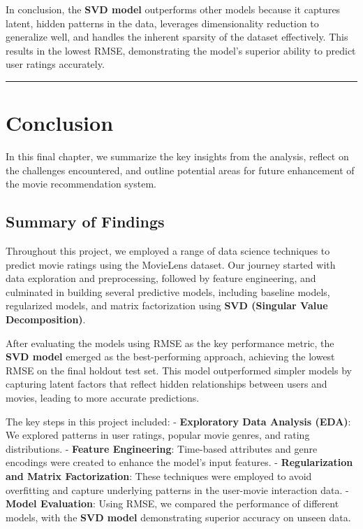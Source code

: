 \documentclass[
]{article}
\begin{document}
In conclusion, the \textbf{SVD model} outperforms other models because
it captures latent, hidden patterns in the data, leverages
dimensionality reduction to generalize well, and handles the inherent
sparsity of the dataset effectively. This results in the lowest RMSE,
demonstrating the model's superior ability to predict user ratings
accurately.

\begin{center}\rule{0.5\linewidth}{0.5pt}\end{center}

\section{Conclusion}\label{conclusion}

In this final chapter, we summarize the key insights from the analysis,
reflect on the challenges encountered, and outline potential areas for
future enhancement of the movie recommendation system.

\subsection{Summary of Findings}\label{summary-of-findings}

Throughout this project, we employed a range of data science techniques
to predict movie ratings using the MovieLens dataset. Our journey
started with data exploration and preprocessing, followed by feature
engineering, and culminated in building several predictive models,
including baseline models, regularized models, and matrix factorization
using \textbf{SVD (Singular Value Decomposition)}.

After evaluating the models using RMSE as the key performance metric,
the \textbf{SVD model} emerged as the best-performing approach,
achieving the lowest RMSE on the final holdout test set. This model
outperformed simpler models by capturing latent factors that reflect
hidden relationships between users and movies, leading to more accurate
predictions.

The key steps in this project included: - \textbf{Exploratory Data
Analysis (EDA)}: We explored patterns in user ratings, popular movie
genres, and rating distributions. - \textbf{Feature Engineering}:
Time-based attributes and genre encodings were created to enhance the
model's input features. - \textbf{Regularization and Matrix
Factorization}: These techniques were employed to avoid overfitting and
capture underlying patterns in the user-movie interaction data. -
\textbf{Model Evaluation}: Using RMSE, we compared the performance of
different models, with the \textbf{SVD model} demonstrating superior
accuracy on unseen data.
\end{document}
